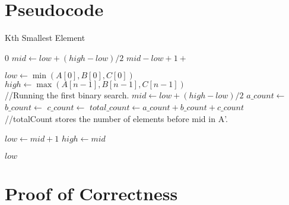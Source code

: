 \documentclass{article}
\begin{document}
\section{Pseudocode}
\begin{algorithm}
\caption{Kth Smallest Element}
\begin{algorithmic}[1]
            \State \Return $0$
        \EndIf
        \State $mid \gets low + (high - low) / 2$
            \State \Return $mid - low + 1 +$ 
        \Else
            \State \Return {}
        \EndIf
    \EndFunction

    \vspace{0.5cm}

        \State $low \gets \min(A[0], B[0], C[0])$
        \State $high \gets \max(A[n-1], B[n-1], C[n-1])$
        \\  //Running the first binary search.
            \State $mid \gets low + (high - low) / 2$
            \State $a\_count \gets$ 
            \State $b\_count \gets$ 
            \State $c\_count \gets$ 
            \State $total\_count \gets a\_count + b\_count + c\_count$
            \\//totalCount stores the number of elements before mid in A'.
            
                \State $low \gets mid + 1$
            \Else
                \State $high \gets mid$
            \EndIf
        \EndWhile
        
        \State \Return $low$
    \EndFunction
\end{algorithmic}
\end{algorithm}


\section{Proof of Correctness}
\end{document}
